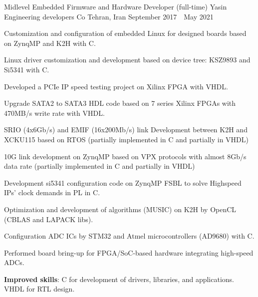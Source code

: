 \begin{cventries}
  \cventry
    {Midlevel Embedded Firmware and Hardware Developer (full-time)} %
    {Yasin Engineering developers Co} %
    {Tehran, Iran} %
    {September 2017~\textendash~May 2021} %
    {
      \begin{cvitems} %
	\item {Customization and configuration of embedded Linux for designed boards based on ZynqMP and K2H with C.}
	\item {Linux driver customization and development based on device tree: KSZ9893 and Si5341 with C.}
	\item {Developed a PCIe IP speed testing project on Xilinx FPGA with VHDL.}
	\item {Upgrade SATA2 to SATA3 HDL code based on 7 series Xilinx FPGAs with 470MB/s write rate with VHDL.}
	\item {SRIO (4x6Gb/s) and EMIF (16x200Mb/s) link Development between K2H and XCKU115 based on RTOS (partially implemented in C and partially in VHDL)}
	\item {10G link development on ZynqMP based on VPX protocols with almost 8Gb/s data rate (partially implemented in C and partially in VHDL)}
	\item {Development si5341 configuration code on ZynqMP FSBL to solve Highspeed IPs’ clock demands in PL in C.}
	\item {Optimization and development of algorithms (MUSIC) on K2H by OpenCL (CBLAS and LAPACK libs).}
	\item {Configuration ADC ICs by STM32 and Atmel microcontrollers (AD9680) with C.}
	\item {Performed board bring-up for FPGA/SoC-based hardware integrating high-speed ADCs.}
	\item {\textbf{Improved skills}: C for development of drivers, libraries, and applications. VHDL for RTL design.}
      \end{cvitems}
    }
    

\end{cventries}
